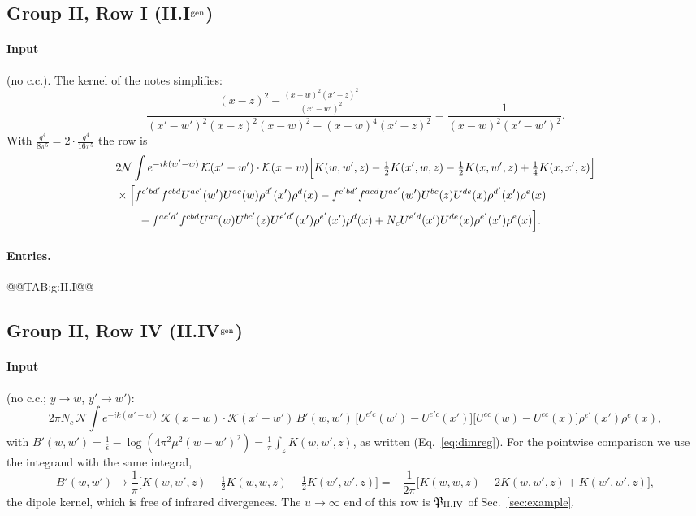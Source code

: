 \documentclass[10pt]{article}
\numberwithin{equation}{section}
\newcommand{\KK}{\mathcal K}
\newcommand{\NN}{\mathcal N}
\newcommand{\PP}{\mathfrak P}
\begin{document}
\subsection{Group II, Row I \texorpdfstring{(II.I$^{\rm gen}$)}{}}\label{src:g:II.I}
\paragraph{Input} (no c.c.). The kernel of the notes simplifies:
\begin{equation}
\frac{(x-z)^2-\frac{(x-w)^2(x'-z)^2}{(x'-w')^2}}{(x'-w')^2(x-z)^2(x-w)^2-(x-w)^4(x'-z)^2}=\frac{1}{(x-w)^2(x'-w')^2}.
\end{equation}
With $\frac{g^4}{8\pi^5}=2\cdot\frac{g^4}{16\pi^5}$ the row is
\begin{align}
&2\NN\int e^{-ik(w'-w)}\,\KK(x'-w')\cdot\KK(x-w)\Big[K(w,w',z)-\tfrac12K(x',w,z)-\tfrac12K(x,w',z)+\tfrac14K(x,x',z)\Big]\notag\\
&\times\Big[f^{c'bd'}f^{cbd}U^{ac'}(w')U^{ac}(w)\rho^{d'}(x')\rho^d(x)-f^{c'bd'}f^{acd}U^{ac'}(w')U^{bc}(z)U^{de}(x)\rho^{d'}(x')\rho^e(x)\notag\\
&\qquad-f^{ac'd'}f^{cbd}U^{ac}(w)U^{bc'}(z)U^{e'd'}(x')\rho^{e'}(x')\rho^d(x)+N_cU^{e'd}(x')U^{de}(x)\rho^{e'}(x')\rho^e(x)\Big].
\end{align}
\paragraph{Entries.}
@@TAB:g:II.I@@

\subsection{Group II, Row IV \texorpdfstring{(II.IV$^{\rm gen}$)}{}}\label{src:g:II.IV}
\paragraph{Input} (no c.c.; $y\to w$, $y'\to w'$):
\begin{equation}
2\pi N_c\,\NN\int e^{-ik(w'-w)}\,\KK(x-w)\cdot\KK(x'-w')\,B'(w,w')\,\big[U^{e'c}(w')-U^{e'c}(x')\big]\big[U^{ec}(w)-U^{ec}(x)\big]\rho^{e'}(x')\rho^e(x),
\end{equation}
with $B'(w,w')=\frac1{\bar\epsilon}-\log(4\pi^2\mu^2(w-w')^2)=\frac1\pi\int_zK(w,w',z)$, as written (Eq.~\eqref{eq:dimreg}). For the pointwise comparison we use the integrand with the same integral,
\begin{equation}
B'(w,w')\to\frac1\pi\Big[K(w,w',z)-\tfrac12K(w,w,z)-\tfrac12K(w',w',z)\Big]=-\frac1{2\pi}\Big[K(w,w,z)-2K(w,w',z)+K(w',w',z)\Big],
\end{equation}
the dipole kernel, which is free of infrared divergences. The $u\to\infty$ end of this row is $\PP_{\rm II.IV}$ of Sec.~\ref{sec:example}.
\end{document}
